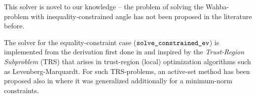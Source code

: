This solver is novel to our knowledge -- the problem of solving the Wahba-problem with inequality-constrained angle has not been proposed in the literature before.

The solver for the equality-constraint case ($\texttt{solve\_constrained\_ev}$) is implemented from the derivation first done in \cite{10.1007/978-3-642-75536-1_57} and inspired by the \textit{Trust-Region Subproblem} (TRS) that arises in trust-region (local) optimization algorithms \cite{Adachi2017SolvingTT} such as Levenberg-Marquardt. For such TRS-problems, an active-set method has been proposed also in \cite{Rontsis2022} where it was generalized additionally for a minimum-norm constraints.

